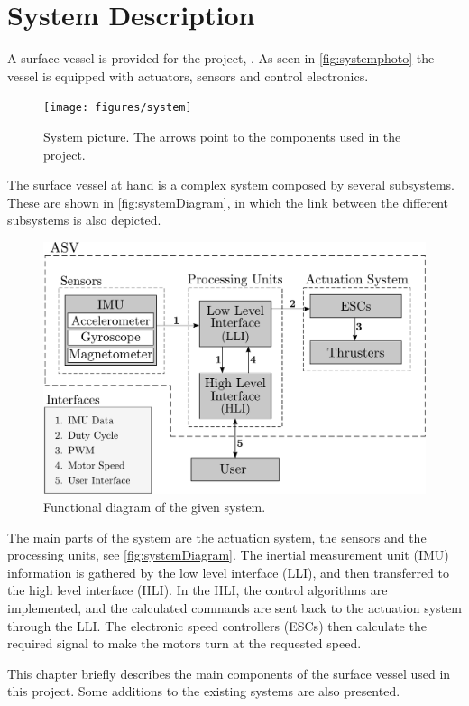 \chapter{System Description}
A surface vessel is provided for the project, \cite{aauship}. As seen in \autoref{fig:systemphoto} the vessel is equipped with actuators, sensors and control electronics.

\begin{figure}[H]
    \texttt{[image: figures/system]}
    \caption{System picture. The arrows point to the components used in the project.}
    \label{fig:systemphoto}
\end{figure}

The surface vessel at hand is a complex system composed by several subsystems. These are shown in \autoref{fig:systemDiagram}, in which the link between the different subsystems is also depicted.
%
\begin{figure}[H]
    \includegraphics[width=.65\textwidth]{figures/systemDiagram4}
    \caption{Functional diagram of the given system.}
    \label{fig:systemDiagram}
\end{figure}
%

The main parts of the system are the actuation system, the sensors and the processing units, see \autoref{fig:systemDiagram}. The inertial measurement unit (IMU) information is gathered by the low level interface (LLI), and then transferred to the high level interface (HLI). In the HLI, the control algorithms are implemented, and the calculated commands are sent back to the actuation system through the LLI. The electronic speed controllers (ESCs) then calculate the required signal to make the motors turn at the requested speed.

This chapter briefly describes the main components of the surface vessel used in this project. Some additions to the existing systems are also presented.

